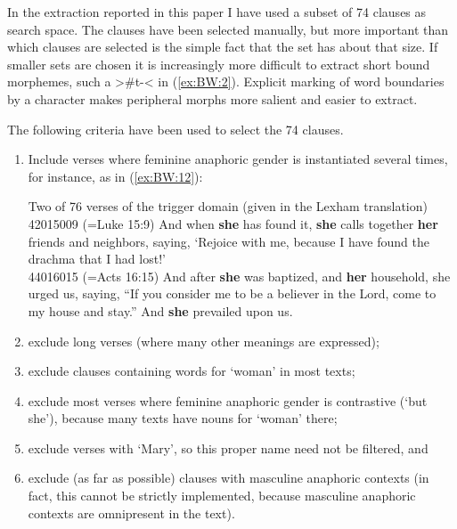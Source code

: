 \documentclass[output=collectionpaper]{langsci/langscibook}
\begin{document}
In the extraction reported in this paper I have used a subset of 74 clauses as search space. The clauses have been selected manually, but more important than which clauses are selected is the simple fact that the set has about that size. If smaller sets are chosen it is increasingly more difficult to extract short bound morphemes, such a  >\#t-< in (\ref{ex:BW:2}). Explicit marking of word boundaries by a character makes peripheral morphs more salient and easier to extract.

\largerpage
The following criteria have been used to select the 74 clauses.

\begin{enumerate}[label=(\roman*)]
  \item Include verses where feminine anaphoric gender is instantiated several times, for instance, as in (\ref{ex:BW:12}):

  \ea\label{ex:BW:12}
  Two of 76 verses of the trigger domain (given in the  Lexham translation)\\
42015009 (=Luke 15:9) And when \textbf{she} has found it, \textbf{she} calls together \textbf{her} friends and neighbors, saying, ‘Rejoice with me, because I have found the drachma that I had lost!’\\
44016015 (=Acts 16:15) And after \textbf{she} was baptized, and \textbf{her} household, she urged us, saying, “If you consider me to be a believer in the Lord, come to my house and stay.” And \textbf{she} prevailed upon us.
\z

  \item exclude long verses (where many other meanings are expressed);
  \item exclude clauses containing words for ‘woman’ in most texts;
  \item exclude most verses where feminine anaphoric gender is contrastive (‘but she’), because many texts have nouns for ‘woman’ there;
  \item exclude verses with ‘Mary’, so this proper name need not be filtered, and
  \item exclude (as far as possible) clauses with masculine anaphoric contexts (in fact, this cannot be strictly implemented, because masculine anaphoric contexts are omnipresent in the text).
\end{enumerate}
\end{document}
